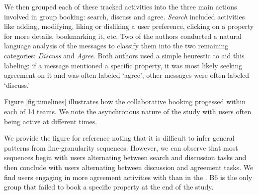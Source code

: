 We then grouped each of these tracked activities into the three main actions involved in group booking: search, discuss and agree. \textit{Search} included activities like adding, modifying, liking or disliking a user preference, clicking on a property for more details, bookmarking it, etc. Two of the authors conducted a natural language analysis of the messages to classify them into the two remaining categories: \textit{Discuss} and \textit{Agree}. Both authors used a simple heurestic to aid this labeling: if a message mentioned a specific property, it was most likely seeking agreement on it and was often labeled `agree', other messages were often labeled `discuss.'



Figure \ref{fig:timelines} illustrates how the collaborative booking progessed within each of 14 teams. We note the asynchronous nature of the study with users often being active at different times. 

We provide the figure for reference noting that it is difficult to infer general patterns from fine-granularity sequences. However, we can observe that most sequences begin with users alternating between search and discussion tasks and then conclude with users alternating between discussion and agreement tasks. We find users engaging in more agreement activities with \tool than in the \baseline. B6 is the only group that failed to book a specific property at the end of the study.

